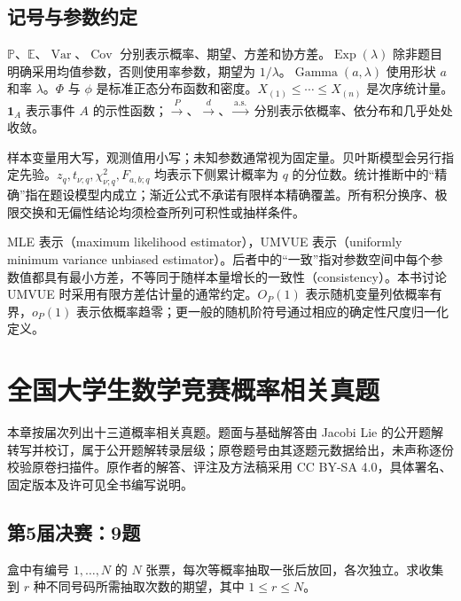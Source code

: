 \documentclass[UTF8,12pt,a4paper,fontset=fandol]{ctexbook}
\newcommand{\E}{\mathbb E}
\newcommand{\PP}{\mathbb P}
\DeclareMathOperator{\Var}{Var}
\DeclareMathOperator{\Cov}{Cov}
\begin{document}
\section*{记号与参数约定}
$\PP$、$\E$、$\Var$、$\Cov$ 分别表示概率、期望、方差和协方差。$\operatorname{Exp}(\lambda)$ 除非题目明确采用均值参数，否则使用率参数，期望为 $1/\lambda$。$\operatorname{Gamma}(a,\lambda)$ 使用形状 $a$ 和率 $\lambda$。$\Phi$ 与 $\phi$ 是标准正态分布函数和密度。$X_{(1)}\le\cdots\le X_{(n)}$ 是次序统计量。$\mathbf1_A$ 表示事件 $A$ 的示性函数；$\xrightarrow{P}$、$\xrightarrow{d}$、$\xrightarrow{\mathrm{a.s.}}$ 分别表示依概率、依分布和几乎处处收敛。

样本变量用大写，观测值用小写；未知参数通常视为固定量。贝叶斯模型会另行指定先验。$z_q,t_{\nu;q},\chi^2_{\nu;q},F_{a,b;q}$ 均表示下侧累计概率为 $q$ 的分位数。统计推断中的“精确”指在题设模型内成立；渐近公式不承诺有限样本精确覆盖。所有积分换序、极限交换和无偏性结论均须检查所列可积性或抽样条件。

MLE 表示（maximum likelihood estimator），UMVUE 表示（uniformly minimum variance unbiased estimator）。后者中的“一致”指对参数空间中每个参数值都具有最小方差，不等同于随样本量增长的一致性（consistency）。本书讨论 UMVUE 时采用有限方差估计量的通常约定。$O_P(1)$ 表示随机变量列依概率有界，$o_P(1)$ 表示依概率趋零；更一般的随机阶符号通过相应的确定性尺度归一化定义。
\tableofcontents
\clearpage


\chapter{全国大学生数学竞赛概率相关真题}

本章按届次列出十三道概率相关真题。题面与基础解答由 Jacobi Lie 的公开题解转写并校订，属于公开题解转录层级；原卷题号由其逐题元数据给出，未声称逐份校验原卷扫描件。原作者的解答、评注及方法稿采用 CC BY-SA 4.0，具体署名、固定版本及许可见全书编写说明。

\section{第5届决赛：9题}\label{pr:fin05-hi:9}

\begin{example}[公开题解转录]\label{q:fin05-hi:9}

盒中有编号 $1,\ldots,N$ 的 $N$ 张票，每次等概率抽取一张后放回，各次独立。求收集到 $r$ 种不同号码所需抽取次数的期望，其中 $1\le r\le N$。

\end{example}
\end{document}
